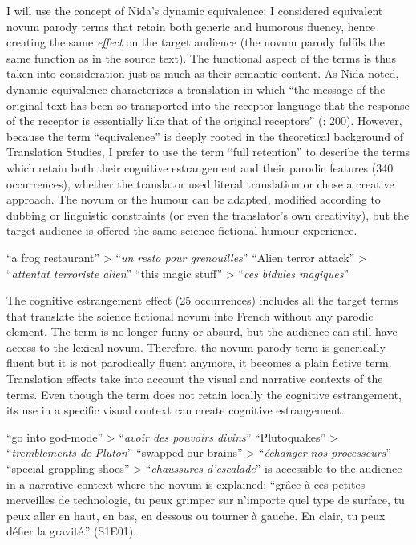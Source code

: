 \documentclass[output=paper]{langscibook}
\begin{document}
I will use the concept of Nida’s dynamic equivalence: I considered equivalent novum parody terms that retain both generic and humorous fluency, hence creating the same \textit{effect} on the target audience (the novum parody fulfils the same function as in the source text). The functional aspect of the terms is thus taken into consideration just as much as their semantic content. As Nida noted, dynamic equivalence characterizes a translation in which “the message of the original text has been so transported into the receptor language that the response of the receptor is essentially like that of the original receptors” (\citealt{NidaTaber1969}: 200). However, because the term “equivalence” is deeply rooted in the theoretical background of Translation Studies, I prefer to use the term “full retention” to describe the terms which retain both their cognitive estrangement and their parodic features (340 occurrences), whether the translator used literal translation or chose a creative approach.  The novum or the humour can be adapted, modified according to dubbing or linguistic constraints (or even the translator’s own creativity), but the target audience is offered the same science fictional humour experience.

\ea\label{ex:ray:12} “a frog restaurant” > “\textit{un resto pour grenouilles}”
\z
\ea\label{ex:ray:13} “Alien terror attack” > “\textit{attentat terroriste alien}”
\z
\ea\label{ex:ray:14} “this magic stuff” > “\textit{ces bidules magiques}”
\z

The cognitive estrangement effect (25 occurrences) includes all the target terms that translate the science fictional novum into French without any parodic element. The term is no longer funny or absurd, but the audience can still have access to the lexical novum. Therefore, the novum parody term is generically fluent but it is not parodically fluent anymore, it becomes a plain fictive term. Translation effects take into account the visual and narrative contexts of the terms. Even though the term does not retain locally the cognitive estrangement, its use in a specific visual context can create cognitive estrangement.

\ea\label{ex:ray:15} “go into god-mode” > “\textit{avoir des pouvoirs divins}”
\z
\ea\label{ex:ray:16} “Plutoquakes” > “\textit{tremblements de Pluton}”
\z
\ea\label{ex:ray:17} “swapped our brains” > “\textit{échanger nos processeurs}”
\z
\ea\label{ex:ray:18} “special grappling shoes” > “\textit{chaussures d’escalade}” is accessible to the audience in a narrative context where the novum is explained: “grâce à ces petites merveilles de technologie, tu peux grimper sur n’importe quel type de surface, tu peux aller en haut, en bas, en dessous ou tourner à gauche. En clair, tu peux défier la gravité.” (S1E01).
\z
\end{document}
